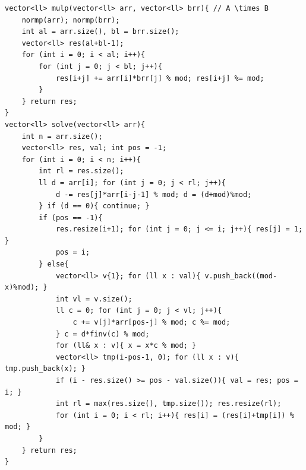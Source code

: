 \begin{verbatim}
vector<ll> mulp(vector<ll> arr, vector<ll> brr){ // A \times B
	normp(arr); normp(brr);
	int al = arr.size(), bl = brr.size();
	vector<ll> res(al+bl-1);
	for (int i = 0; i < al; i++){
		for (int j = 0; j < bl; j++){
			res[i+j] += arr[i]*brr[j] % mod; res[i+j] %= mod;
		}
	} return res;
}
vector<ll> solve(vector<ll> arr){
	int n = arr.size();
	vector<ll> res, val; int pos = -1;
	for (int i = 0; i < n; i++){
		int rl = res.size();
		ll d = arr[i]; for (int j = 0; j < rl; j++){
			d -= res[j]*arr[i-j-1] % mod; d = (d+mod)%mod;
		} if (d == 0){ continue; }
		if (pos == -1){
			res.resize(i+1); for (int j = 0; j <= i; j++){ res[j] = 1; }
			pos = i;
		} else{
			vector<ll> v{1}; for (ll x : val){ v.push_back((mod-x)%mod); }
			int vl = v.size();
			ll c = 0; for (int j = 0; j < vl; j++){
				c += v[j]*arr[pos-j] % mod; c %= mod;
			} c = d*finv(c) % mod;
			for (ll& x : v){ x = x*c % mod; }
			vector<ll> tmp(i-pos-1, 0); for (ll x : v){ tmp.push_back(x); }
			if (i - res.size() >= pos - val.size()){ val = res; pos = i; }
			int rl = max(res.size(), tmp.size()); res.resize(rl); 
			for (int i = 0; i < rl; i++){ res[i] = (res[i]+tmp[i]) % mod; }
		}
	} return res;
}
\end{verbatim}